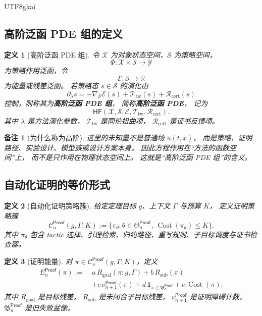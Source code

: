 \documentclass[12pt]{article}
\newtheorem{definition}{定义}[section]
\newtheorem{remark}{备注}[section]
\newcommand{\RR}{\mathbb{R}}
\newcommand{\ProofAuto}{\mathsf{Proof}}
\newcommand{\HF}{\mathsf{HF}}
\newcommand{\Cost}{\operatorname{Cost}}
\begin{document}
\begin{CJK*}{UTF8}{gkai}
\subsection{高阶泛函 PDE 组的定义}
\label{subsec:tex53-hf-pde}

\begin{definition}[高阶泛函 PDE 组]
令 \(\mathcal X\) 为对象状态空间，\(\mathcal S\) 为策略空间，
\[
  \Phi:\mathcal X\times\mathcal S\to\mathcal Y
\]
为策略作用泛函，令
\[
  \mathcal E:\mathcal S\to\RR
\]
为能量或残差泛函。
若策略态 \(s\in\mathcal S\) 的演化由
\[
  \partial_\lambda s
  =
  -\nabla_{\mathcal S}\mathcal E(s)
  +
  \mathcal T_{\mathrm{tw}}(s)
  +
  \mathcal R_{\mathrm{cert}}(s)
\]
控制，则称其为\textbf{高阶泛函 PDE 组}，
简称\textbf{高阶泛函 PDE}，
记为
\[
  \HF(\mathcal X,\mathcal S,\mathcal E,\mathcal T_{\mathrm{tw}},\mathcal R_{\mathrm{cert}}).
\]
其中 \(\lambda\) 是方法演化参数，
\(\mathcal T_{\mathrm{tw}}\) 是同伦扭曲项，
\(\mathcal R_{\mathrm{cert}}\) 是证书反馈项。
\end{definition}

\begin{remark}[为什么称为高阶]
这里的未知量不是普通场 \(u(t,x)\)，
而是策略、证明路径、实验设计、模型族或设计方案本身。
因此方程作用在“方法的函数空间”上，
而不是只作用在物理状态空间上。
这就是“高阶泛函 PDE 组”的含义。
\end{remark}

\subsection{自动化证明的等价形式}
\label{subsec:tex53-proof-auto}

\begin{definition}[自动化证明策略簇]
给定定理目标 \(g\)、上下文 \(\Gamma\) 与预算 \(K\)，
定义证明策略簇
\[
  \mathcal C^{\ProofAuto}_n(g,\Gamma;K)
  :=
  \{
    \pi_\theta:
    \theta\in\Theta^{\ProofAuto}_n,\ 
    \Cost(\pi_\theta)\le K
  \}.
\]
其中 \(\pi_\theta\) 包含 tactic 选择、引理检索、归约路径、重写规则、子目标调度与证书检查器。
\end{definition}

\begin{definition}[证明能量]
对 \(\pi\in\mathcal C^{\ProofAuto}_n(g,\Gamma;K)\)，定义
\[
\begin{aligned}
  E^{\ProofAuto}_n(\pi)
  :=\;&
  a\,R_{\mathrm{goal}}(\pi;g,\Gamma)
  + b\,R_{\mathrm{sub}}(\pi)\\
  &+ c\,\nu^{\ProofAuto}_{n+1}(\pi)
  + d\,\mathbf 1_{\pi\in\mathfrak B^{\ProofAuto}_n}
  + e\,\Cost(\pi).
\end{aligned}
\]
其中 \(R_{\mathrm{goal}}\) 是目标残差，
\(R_{\mathrm{sub}}\) 是未闭合子目标残差，
\(\nu^{\ProofAuto}_{n+1}\) 是证明障碍计数，
\(\mathfrak B^{\ProofAuto}_n\) 是旧失败盆像。
\end{definition}


\end{CJK*}
\end{document}
